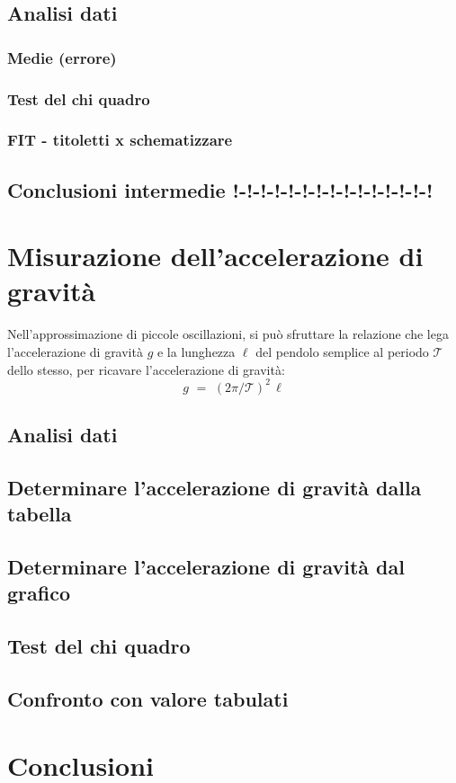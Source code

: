 \documentclass[11pt, twoside, a4paper]{article}
\begin{document}
	\subsection{Analisi dati}
		\subsubsection{Medie (errore)}
		
		\subsubsection{Test del chi quadro}
		
		\subsubsection{FIT - titoletti x schematizzare}
		
	\subsection{Conclusioni intermedie !-!-!-!-!-!-!-!-!-!-!-!-!-!-!}
	
\newpage
\section{Misurazione dell'accelerazione di gravità}
%
Nell'approssimazione di piccole oscillazioni, si può sfruttare la relazione che lega l'accelerazione di gravità $g$ e la lunghezza $\ell$ del pendolo semplice al periodo $\mathcal{T}$ dello stesso, per ricavare l'accelerazione di gravità:
\begin{equation}
	g \,\, = \,\, (2 \pi / \mathcal{T})^2 \,\ell
\end{equation}
	\subsection{Analisi dati}
	
	\subsection{Determinare l'accelerazione di gravità dalla tabella}
	
	\subsection{Determinare l'accelerazione di gravità dal grafico}
	
	\subsection{Test del chi quadro}
	
	\subsection{Confronto con valore tabulati}
	

\newpage
\section{Conclusioni}

\end{document}
